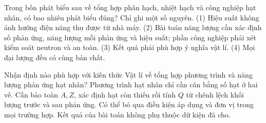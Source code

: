 \begin{ex}
Trong bốn phát biểu sau về tổng hợp phân hạch, nhiệt hạch và công nghiệp hạt nhân, có bao nhiêu phát biểu đúng? Chỉ ghi một số nguyên. (1) Hiệu suất không ảnh hưởng điện năng thu được từ nhà máy. (2) Bài toán năng lượng cần xác định số phản ứng, năng lượng mỗi phản ứng và hiệu suất; phần công nghiệp phải xét kiểm soát neutron và an toàn. (3) Kết quả phải phù hợp ý nghĩa vật lí. (4) Mọi đại lượng đều có cùng bản chất.
\end{ex}

\begin{ex}
Nhận định nào phù hợp với kiến thức Vật lí về tổng hợp phương trình và năng lượng phản ứng hạt nhân?
\choice
{Phương trình hạt nhân chỉ cần cân bằng số hạt ở hai vế.}
{\True Cần bảo toàn $A,Z$, xác định hạt còn thiếu rồi tính $Q$ từ chênh lệch khối lượng trước và sau phản ứng.}
{Có thể bỏ qua điều kiện áp dụng và đơn vị trong mọi trường hợp.}
{Kết quả của bài toán không phụ thuộc dữ kiện đã cho.}
\end{ex}

